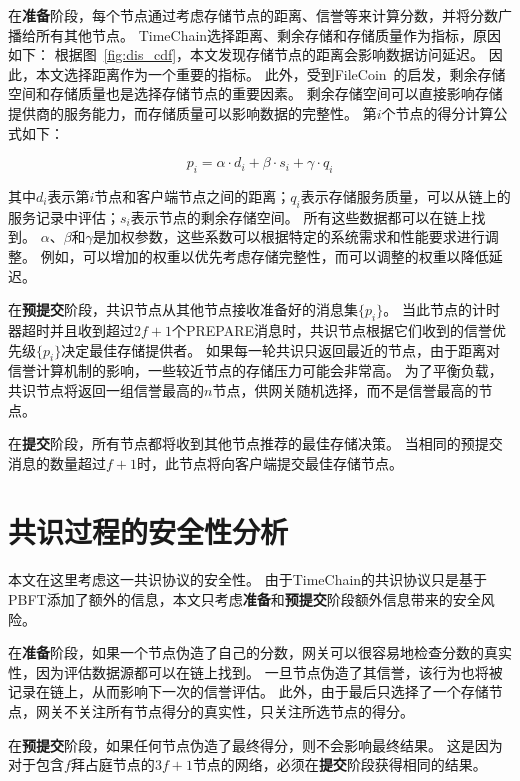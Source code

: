 在\textbf{准备}阶段，每个节点通过考虑存储节点的距离、信誉等来计算分数，并将分数广播给所有其他节点。
TimeChain选择距离、剩余存储和存储质量作为指标，原因如下：
根据图~\autoref{fig:dis_cdf}，本文发现存储节点的距离会影响数据访问延迟。
因此，本文选择距离作为一个重要的指标。
此外，受到FileCoin~\cite{bauer2022filecoin}的启发，剩余存储空间和存储质量也是选择存储节点的重要因素。
剩余存储空间可以直接影响存储提供商的服务能力，而存储质量可以影响数据的完整性。
第$i$个节点的得分计算公式如下：

\begin{equation} 
    \label{eq:score}
    p_i=\alpha\cdot d_i+\beta\cdot s_i+\gamma\cdot q_i
\end{equation}

其中$d_i$表示第$i$节点和客户端节点之间的距离；$q_i$表示存储服务质量，可以从链上的服务记录中评估；$s_i$表示节点的剩余存储空间。
所有这些数据都可以在链上找到。
$\alpha$、$\beta$和$\gamma$是加权参数，这些系数可以根据特定的系统需求和性能要求进行调整。
例如，可以增加的权重以优先考虑存储完整性，而可以调整的权重以降低延迟。

在\textbf{预提交}阶段，共识节点从其他节点接收准备好的消息集$\{p_i\}$。
当此节点的计时器超时并且收到超过$2f+1$个PREPARE消息时，共识节点根据它们收到的信誉优先级$\{p_i\}$决定最佳存储提供者。
如果每一轮共识只返回最近的节点，由于距离对信誉计算机制的影响，一些较近节点的存储压力可能会非常高。
为了平衡负载，共识节点将返回一组信誉最高的$n$节点，供网关随机选择，而不是信誉最高的节点。

在\textbf{提交}阶段，所有节点都将收到其他节点推荐的最佳存储决策。
当相同的预提交消息的数量超过$f+1$时，此节点将向客户端提交最佳存储节点。

\section{共识过程的安全性分析}
本文在这里考虑这一共识协议的安全性。
由于TimeChain的共识协议只是基于PBFT添加了额外的信息，本文只考虑\textbf{准备}和\textbf{预提交}阶段额外信息带来的安全风险。

在\textbf{准备}阶段，如果一个节点伪造了自己的分数，网关可以很容易地检查分数的真实性，因为评估数据源都可以在链上找到。
一旦节点伪造了其信誉，该行为也将被记录在链上，从而影响下一次的信誉评估。
此外，由于最后只选择了一个存储节点，网关不关注所有节点得分的真实性，只关注所选节点的得分。

在\textbf{预提交}阶段，如果任何节点伪造了最终得分，则不会影响最终结果。
这是因为对于包含$f$拜占庭节点的$3f+1$节点的网络，必须在\textbf{提交}阶段获得相同的结果。

